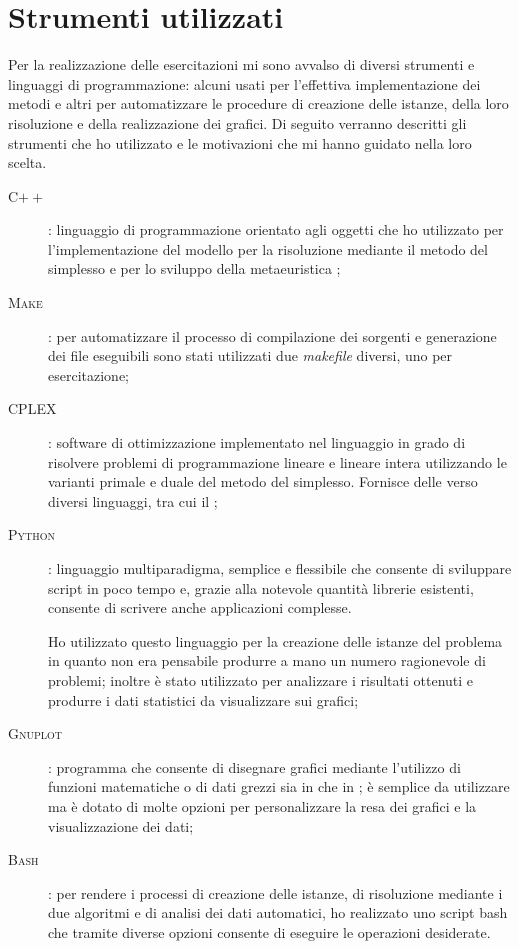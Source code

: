 \section{Strumenti utilizzati}
Per la realizzazione delle esercitazioni mi sono avvalso di diversi strumenti e linguaggi di programmazione: alcuni usati per l'effettiva implementazione dei metodi e altri per automatizzare le procedure di creazione delle istanze, della loro risoluzione e della realizzazione dei grafici.
Di seguito verranno descritti gli strumenti che ho utilizzato e le motivazioni che mi hanno guidato nella loro scelta.

\begin{description}
	\item[\textsc{C$++$}]: linguaggio di programmazione orientato agli oggetti che ho utilizzato per l'implementazione del modello per la risoluzione mediante il metodo del simplesso e per lo sviluppo della metaeuristica \tabu;
	\item[\textsc{Make}]: per automatizzare il processo di compilazione dei sorgenti e generazione dei file eseguibili sono stati utilizzati due \emph{makefile} diversi, uno per esercitazione;
	\item[\textsc{CPLEX}]: software di ottimizzazione implementato nel linguaggio  in grado di risolvere problemi di programmazione lineare e lineare intera utilizzando le varianti primale e duale del metodo del simplesso. Fornisce delle  verso diversi linguaggi, tra cui il ;
	\item[\textsc{Python}]: linguaggio multiparadigma, semplice e flessibile che consente di sviluppare script in poco tempo e, grazie alla notevole quantità librerie esistenti, consente di scrivere anche applicazioni complesse.
	
	Ho utilizzato questo linguaggio per la creazione delle istanze del problema in quanto non era pensabile produrre a mano un numero ragionevole di problemi; inoltre è stato utilizzato per analizzare i risultati ottenuti e produrre i dati statistici da visualizzare sui grafici;
	\item[\textsc{Gnuplot}]: programma che consente di disegnare grafici mediante l'utilizzo di funzioni matematiche o di dati grezzi sia in  che in ; è semplice da utilizzare ma è dotato di molte opzioni per personalizzare la resa dei grafici e la visualizzazione dei dati;
	\item[\textsc{Bash}]: per rendere i processi di creazione delle istanze, di risoluzione mediante i due algoritmi e di analisi dei dati automatici, ho realizzato uno script bash che tramite diverse opzioni consente di eseguire le operazioni desiderate.
\end{description}

